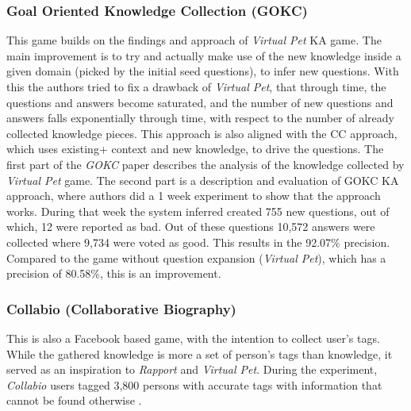 \subsubsection{Goal Oriented Knowledge Collection (GOKC)}
\label{section:r:gokc}
This game builds on the
findings and approach of \emph{Virtual Pet} KA game. The main improvement
is to try and actually make use of the new knowledge inside a given domain
(picked by the initial seed questions), to infer new questions. With this
the authors tried to fix a drawback of \emph{Virtual Pet}, that through
time, the questions and answers become saturated, and the number of new
questions and answers falls exponentially through time, with respect
to the number of already collected knowledge pieces.
This approach is also aligned with the CC approach, which uses existing+
context and new knowledge, to drive the questions. The first part of the \emph{GOKC}
paper describes the analysis of the knowledge collected by \emph{Virtual Pet} game. 
The second part is a description and evaluation of  GOKC KA approach, where 
authors did a 1 week experiment to show that the approach works. During that 
week the system inferred created 755 new questions, out of which, 12 were
reported as bad. Out of these questions 10,572 answers were collected where
9,734 were voted as good. This results in the 92.07\% precision. Compared
to the game without question expansion (\emph{Virtual Pet}), which has
a precision of 80.58\%, this is an improvement.

\subsubsection{Collabio (Collaborative Biography)}
\label{section:r:collabio}
This is also a Facebook based game, with the intention to
collect user's tags. While the gathered knowledge is more a set of person's 
tags than knowledge, it served as an inspiration to \emph{Rapport} and 
\emph{Virtual Pet}. During the experiment, \emph{Collabio} users tagged
3,800 persons with accurate tags with information that cannot be found 
otherwise \parencite{Bernstein2009, Bernstein2010}.

